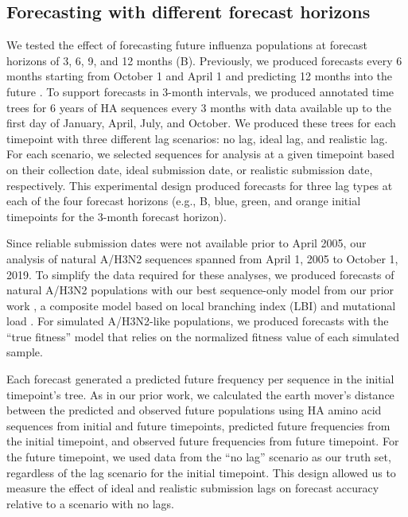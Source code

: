 \documentclass[9pt,lineno]{elife}
\begin{document}
\subsection{Forecasting with different forecast horizons}

We tested the effect of forecasting future influenza populations at forecast horizons of 3, 6, 9, and 12 months (B).
Previously, we produced forecasts every 6 months starting from October 1 and April 1 and predicting 12 months into the future \citep{Huddleston2020}.
To support forecasts in 3-month intervals, we produced annotated time trees for 6 years of HA sequences every 3 months with data available up to the first day of January, April, July, and October.
We produced these trees for each timepoint with three different lag scenarios: no lag, ideal lag, and realistic lag.
For each scenario, we selected sequences for analysis at a given timepoint based on their collection date, ideal submission date, or realistic submission date, respectively.
This experimental design produced forecasts for three lag types at each of the four forecast horizons (e.g., B, blue, green, and orange initial timepoints for the 3-month forecast horizon).

Since reliable submission dates were not available prior to April 2005, our analysis of natural A/H3N2 sequences spanned from April 1, 2005 to October 1, 2019.
To simplify the data required for these analyses, we produced forecasts of natural A/H3N2 populations with our best sequence-only model from our prior work \citep{Huddleston2020}, a composite model based on local branching index (LBI) \citep{Neher:2014eu} and mutational load \citep{Luksza:2014hj}.
For simulated A/H3N2-like populations, we produced forecasts with the ``true fitness'' model that relies on the normalized fitness value of each simulated sample.

Each forecast generated a predicted future frequency per sequence in the initial timepoint's tree.
As in our prior work, we calculated the earth mover's distance \citep{Rubner1998} between the predicted and observed future populations using HA amino acid sequences from initial and future timepoints, predicted future frequencies from the initial timepoint, and observed future frequencies from future timepoint.
For the future timepoint, we used data from the ``no lag'' scenario as our truth set, regardless of the lag scenario for the initial timepoint.
This design allowed us to measure the effect of ideal and realistic submission lags on forecast accuracy relative to a scenario with no lags.
\end{document}
